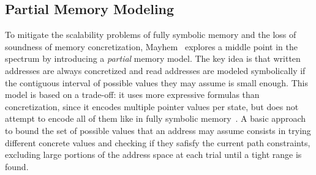 
\subsection{Partial Memory Modeling}
\label{ss:index-based-memory}

To mitigate the scalability problems of fully symbolic memory and the loss of soundness of memory concretization,
{\sc Mayhem}~\cite{MAYHEM-SP12} explores a middle point in the spectrum by introducing a {\em partial} memory model. The key idea is that written addresses are always concretized and read addresses are modeled symbolically if the contiguous interval of possible values they may assume is small enough. This model is based on a trade-off: it uses more expressive formulas than concretization, since it encodes multiple pointer values per state, but does not attempt to encode all of them like in fully symbolic memory~\cite{MAYHEM-THESIS}. A basic approach to bound the set of possible values that an address may assume consists in trying different concrete values and checking if they safisfy the current path constraints, excluding large portions of the address space at each trial until a tight range is found.  
